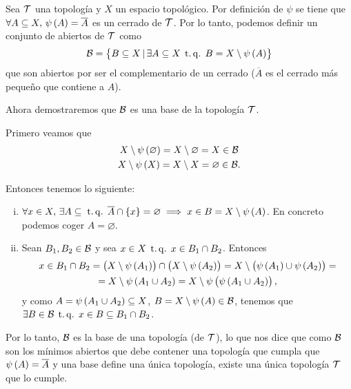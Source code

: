 \begin{eje}
 Sea $\mathcal{T}$ una topología y $X$ un espacio topológico. Por definición de $\psi$ se tiene que $\forall A\subseteq X,\, \psi\left( A\right) =\overline{A}$ es un cerrado de $\mathcal{T}$. Por lo tanto, podemos definir un conjunto de abiertos de $\mathcal{T}$ como
 \[
  \mathcal{B} = \left\{ B\subseteq X\, | \,\exists A \subseteq X \operatorname{\;t.q.\;} B=X\setminus \psi\left( A\right) \right\}
 \]
 que son abiertos por ser el complementario de un cerrado ($\overline{A}$ es el cerrado más pequeño que contiene a $A$).
 
 Ahora demostraremos que $\mathcal{B}$ es una base de la topología $\mathcal{T}$. 

 Primero veamos que
 \begin{gather*}
  X\setminus \psi\left( \varnothing\right) = X\setminus\varnothing = X \in \mathcal{B}\\
  X\setminus \psi\left( X\right) =X\setminus X = \varnothing \in \mathcal{B}.
 \end{gather*}
 
Entonces tenemos lo siguiente:
\begin{enumerate}[i)]
 \item $\forall x\in X,\, \exists A\subseteq \operatorname{\;t.q.\;} \overline{A}\cap\left\{ x\right\} = \varnothing \implies x\in B = X\setminus \psi\left( A\right)$.
 En concreto podemos coger $A=\varnothing$.
 \item Sean $B_1,B_2 \in \mathcal{B}$ y sea $x\in X \operatorname{\;t.q.\;} x\in B_1\cap B_2$. Entonces
 \begin{gather*}
  x\in B_1\cap B_2 = \left( X\setminus \psi\left( A_1\right) \right) \cap \left( X\setminus\psi\left( A_2\right) \right) = X\setminus \left(\psi\left( A_1\right)\cup\psi\left( A_2\right)\right) = \\
  = X\setminus\psi\left( A_1 \cup A_2\right) = X\setminus\psi\left(\psi\left( A_1 \cup A_2\right) \right),
 \end{gather*}
 y como $A=\psi\left( A_1\cup A_2\right) \subseteq X$, $B=X\setminus\psi\left( A\right) \in \mathcal{B}$, tenemos que $\exists B \in \mathcal{B} \operatorname{\;t.q.\;} x\in B \subseteq B_1 \cap B_2$.
\end{enumerate}
Por lo tanto, $\mathcal{B}$ es la base de una topología (de $\mathcal{T}$), lo que nos dice que como $\mathcal{B}$ son los mínimos abiertos que debe contener una topología que cumpla que $\psi\left( A\right) = \overline{A}$ y una base define una única topología, existe una única topología $\mathcal{T}$ que lo cumple. 
\end{eje}

